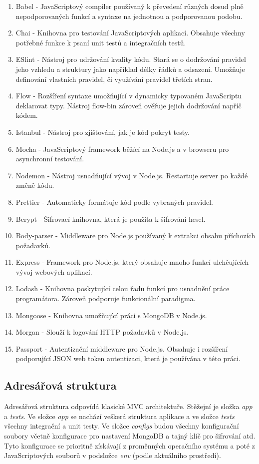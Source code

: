 \documentclass[thesis=M,czech]{FITthesis}[2018/10/20]
\begin{document}
\begin{enumerate}
\item Babel - JavaScriptový compiler používaný k převedení různých dosud plně nepodporovaných funkcí a syntaxe na jednotnou a podporovanou podobu.
\item Chai - Knihovna pro testování JavaScriptových aplikací. Obsahuje všechny potřebné funkce k psaní unit testů a integračních testů.
\item ESlint - Nástroj pro udržování kvality kódu. Stará se o dodržování pravidel jeho vzhledu a struktury jako například délky řádků a odsazení. Umožňuje definování vlastních pravidel, či využívání pravidel třetích stran.
\item Flow - Rozšíření syntaxe umožňující v dynamicky typovaném JavaScriptu deklarovat typy. Nástroj flow-bin zároveň ověřuje jejich dodržování napříč kódem.
\item Istanbul - Nástroj pro zjišťování, jak je kód pokryt testy.
\item Mocha - JavaScriptový framework běžící na Node.js a v browseru pro asynchronní testování.
\item Nodemon - Nástroj usnadňující vývoj v Node.js. Restartuje server po každé změně kódu.
\item Prettier - Automaticky formátuje kód podle vybraných pravidel.
\item Bcrypt - Šifrovací knihovna, která je použita k šifrování hesel.
\item Body-parser - Middleware pro Node.js používaný k extrakci obsahu příchozích požadavků.
\item Express - Framework pro Node.js, který obsahuje mnoho funkcí ulehčujících vývoj webových aplikací. 
\item Lodash - Knihovna poskytující celou řadu funkcí pro usnadnění práce programátora. Zároveň podporuje funkcionální paradigma.
\item Mongoose - Knihovna umožňující práci s MongoDB v Node.js.
\item Morgan - Slouží k logování HTTP požadavků v Node.js.
\item Passport - Autentizační middleware pro Node.js. Obsahuje i rozšíření podporující JSON web token autentizaci, která je používána v této práci.
\end{enumerate}

\subsection{Adresářová struktura}
Adresářová struktura odpovídá klasické MVC architektuře. Stěžejní je složka \textit{app} a \textit{tests}. Ve složce \textit{app} se nachází veškerá struktura aplikace a ve složce \textit{tests} všechny integrační a unit testy. Ve složce \textit{configs} budou všechny konfigurační soubory včetně konfigurace pro nastavení MongoDB a tajný klíč pro šifrování atd. Tyto konfigurace se prioritně získávají z proměnných operačního systému a poté z JavaScriptových souborů v podsložce \textit{env} (podle aktuálního prostředí).
\end{document}

